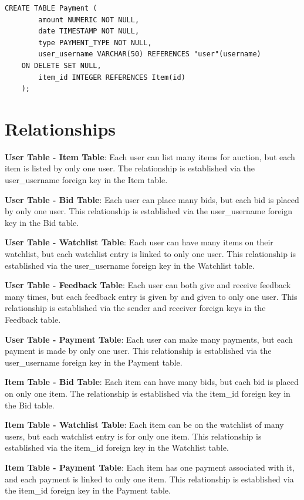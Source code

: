 \begin{lstlisting}[style=sqlStyle]
	CREATE TABLE Payment (
		amount NUMERIC NOT NULL,
		date TIMESTAMP NOT NULL,
		type PAYMENT_TYPE NOT NULL,
		user_username VARCHAR(50) REFERENCES "user"(username)
	ON DELETE SET NULL,
		item_id INTEGER REFERENCES Item(id)
	);
\end{lstlisting}


\section{Relationships}
\textbf{User Table - Item Table}: Each user can list many items for auction, but each item is listed by only one user. The relationship is established via the user\_username foreign key in the Item table.

\textbf{User Table - Bid Table}: Each user can place many bids, but each bid is placed by only one user. This relationship is established via the user\_username foreign key in the Bid table.

\textbf{User Table - Watchlist Table}: Each user can have many items on their watchlist, but each watchlist entry is linked to only one user. This relationship is established via the user\_username foreign key in the Watchlist table.

\textbf{User Table - Feedback Table}: Each user can both give and receive feedback many times, but each feedback entry is given by and given to only one user. This relationship is established via the sender and receiver foreign keys in the Feedback table.

\textbf{User Table - Payment Table}: Each user can make many payments, but each payment is made by only one user. This relationship is established via the user\_username foreign key in the Payment table.

\textbf{Item Table - Bid Table}: Each item can have many bids, but each bid is placed on only one item. The relationship is established via the item\_id foreign key in the Bid table.

\textbf{Item Table - Watchlist Table}: Each item can be on the watchlist of many users, but each watchlist entry is for only one item. This relationship is established via the item\_id foreign key in the Watchlist table.

\textbf{Item Table - Payment Table}: Each item has one payment associated with it, and each payment is linked to only one item. This relationship is established via the item\_id foreign key in the Payment table.

